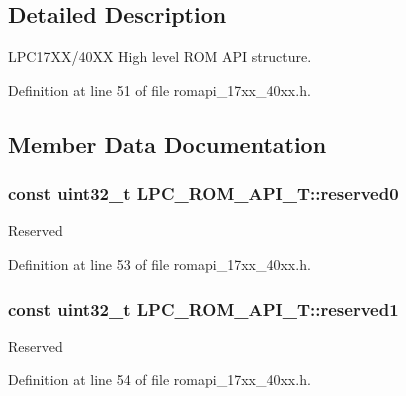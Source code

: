 \subsection{Detailed Description}
L\+P\+C17\+X\+X/40\+XX High level R\+OM A\+PI structure. 

Definition at line 51 of file romapi\+\_\+17xx\+\_\+40xx.\+h.



\subsection{Member Data Documentation}
\subsubsection[{\texorpdfstring{reserved0}{reserved0}}]{\setlength{\rightskip}{0pt plus 5cm}const uint32\+\_\+t L\+P\+C\+\_\+\+R\+O\+M\+\_\+\+A\+P\+I\+\_\+\+T\+::reserved0}\hypertarget{structLPC__ROM__API__T_a93487c5be9000ba3b633bd6c354f8589}{}\label{structLPC__ROM__API__T_a93487c5be9000ba3b633bd6c354f8589}
Reserved 

Definition at line 53 of file romapi\+\_\+17xx\+\_\+40xx.\+h.

\subsubsection[{\texorpdfstring{reserved1}{reserved1}}]{\setlength{\rightskip}{0pt plus 5cm}const uint32\+\_\+t L\+P\+C\+\_\+\+R\+O\+M\+\_\+\+A\+P\+I\+\_\+\+T\+::reserved1}\hypertarget{structLPC__ROM__API__T_a2fce9202473b5986d54262b3d5548e82}{}\label{structLPC__ROM__API__T_a2fce9202473b5986d54262b3d5548e82}
Reserved 

Definition at line 54 of file romapi\+\_\+17xx\+\_\+40xx.\+h.

